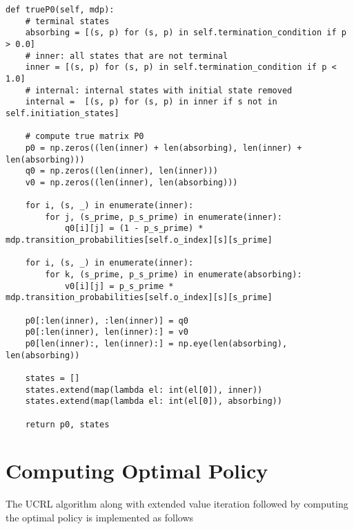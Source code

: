 \begin{verbatim}
def trueP0(self, mdp):
    # terminal states
    absorbing = [(s, p) for (s, p) in self.termination_condition if p > 0.0]
    # inner: all states that are not terminal
    inner = [(s, p) for (s, p) in self.termination_condition if p < 1.0]
    # internal: internal states with initial state removed
    internal =  [(s, p) for (s, p) in inner if s not in self.initiation_states]

    # compute true matrix P0
    p0 = np.zeros((len(inner) + len(absorbing), len(inner) + len(absorbing)))
    q0 = np.zeros((len(inner), len(inner)))
    v0 = np.zeros((len(inner), len(absorbing)))

    for i, (s, _) in enumerate(inner):
        for j, (s_prime, p_s_prime) in enumerate(inner):
            q0[i][j] = (1 - p_s_prime) * mdp.transition_probabilities[self.o_index][s][s_prime]

    for i, (s, _) in enumerate(inner):
        for k, (s_prime, p_s_prime) in enumerate(absorbing):
            v0[i][j] = p_s_prime * mdp.transition_probabilities[self.o_index][s][s_prime]

    p0[:len(inner), :len(inner)] = q0
    p0[:len(inner), len(inner):] = v0
    p0[len(inner):, len(inner):] = np.eye(len(absorbing), len(absorbing))

    states = []
    states.extend(map(lambda el: int(el[0]), inner))
    states.extend(map(lambda el: int(el[0]), absorbing))

    return p0, states
\end{verbatim}

\section{Computing Optimal Policy}

The UCRL algorithm along with extended value iteration followed by computing the optimal policy is implemented as follows

